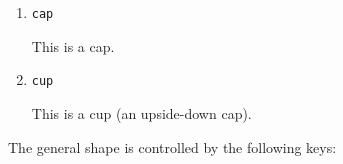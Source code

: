 \documentclass{ltxdoc}
\begin{document}
\begin{enumerate}

\item \Verb+cap+

This is a cap.


\item \Verb+cup+

This is a cup (an upside-down cap).


\end{enumerate}

The general shape is controlled by the following keys:
\end{document}
